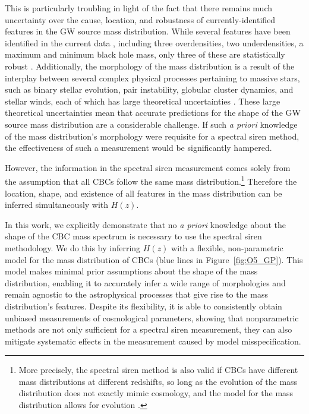 \documentclass[]{aastex631}
\begin{document}
This is particularly troubling in light of the fact that there remains much uncertainty over the cause, location, and robustness of currently-identified features in the \ac{GW} source mass distribution.
While several features have been identified in the current data \citep{tiwari_exploring_2022,edelman_aint_2022, abbott_population_2023,edelman_cover_2023}, including three overdensities, two underdensities, a maximum and minimum black hole mass, only three of these are statistically robust \citep{farah_things_2023}.
Additionally, the morphology of the mass distribution is a result of the interplay between several complex physical processes pertaining to massive stars, such as binary stellar evolution, pair instability, globular cluster dynamics, and stellar winds, each of which has large theoretical uncertainties \citep[e.g.][]{ zevin_constraining_2017, mapelli_binary_2020,marchant_evolution_2023}. 
These large theoretical uncertainties mean that accurate predictions for the shape of the \ac{GW} source mass distribution are a considerable challenge.
If such \emph{a priori} knowledge of the mass distribution's morphology were requisite for a spectral siren method, the effectiveness of such a measurement would be significantly hampered.

However, the information in the spectral siren measurement comes solely from the assumption that all \acp{CBC} follow the same mass distribution.\footnote{More precisely, the spectral siren method is also valid if \acp{CBC} have different mass distributions at different redshifts, so long as the evolution of the mass distribution does not exactly mimic cosmology, and the model for the mass distribution allows for evolution \citep{ezquiaga_spectral_2022}. }
Therefore the location, shape, and existence of all features in the mass distribution can be inferred simultaneously with $H(z)$. 

In this work, we explicitly demonstrate that no \emph{a priori} knowledge about the shape of the \ac{CBC} mass spectrum is necessary to use the spectral siren methodology. 
We do this by inferring $H(z)$ with a flexible, non-parametric model for the mass distribution of \acp{CBC} (blue lines in Figure~\ref{fig:O5_GP}). 
This model makes minimal prior assumptions about the shape of the mass distribution, enabling it to accurately infer a wide range of morphologies and remain agnostic to the astrophysical processes that give rise to the mass distribution's features.
Despite its flexibility, it is able to consistently obtain unbiased measurements of cosmological parameters, showing that nonparametric methods are not only sufficient for a spectral siren measurement, they can also mitigate systematic effects in the measurement caused by model misspecification.
\end{document}
